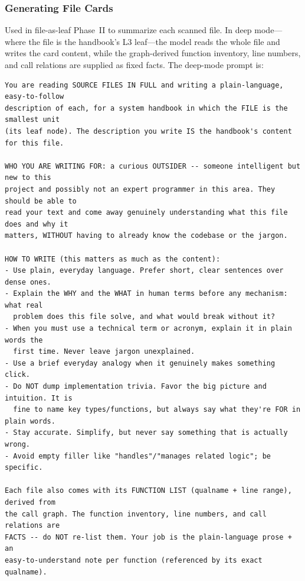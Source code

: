 \documentclass[]{ailab}
\newcommand{\hblarge}{\textsf{file-as-leaf}}
\begin{document}
\subsubsection{Generating File Cards}

Used in \hblarge{} Phase~II to summarize each scanned file. In deep mode---where
the file is the handbook's L3 leaf---the model reads the whole file and writes the
card content, while the graph-derived function inventory, line numbers, and call
relations are supplied as fixed facts. The deep-mode prompt is:

\begin{lstlisting}[style=promptbox]
You are reading SOURCE FILES IN FULL and writing a plain-language, easy-to-follow
description of each, for a system handbook in which the FILE is the smallest unit
(its leaf node). The description you write IS the handbook's content for this file.

WHO YOU ARE WRITING FOR: a curious OUTSIDER -- someone intelligent but new to this
project and possibly not an expert programmer in this area. They should be able to
read your text and come away genuinely understanding what this file does and why it
matters, WITHOUT having to already know the codebase or the jargon.

HOW TO WRITE (this matters as much as the content):
- Use plain, everyday language. Prefer short, clear sentences over dense ones.
- Explain the WHY and the WHAT in human terms before any mechanism: what real
  problem does this file solve, and what would break without it?
- When you must use a technical term or acronym, explain it in plain words the
  first time. Never leave jargon unexplained.
- Use a brief everyday analogy when it genuinely makes something click.
- Do NOT dump implementation trivia. Favor the big picture and intuition. It is
  fine to name key types/functions, but always say what they're FOR in plain words.
- Stay accurate. Simplify, but never say something that is actually wrong.
- Avoid empty filler like "handles"/"manages related logic"; be specific.

Each file also comes with its FUNCTION LIST (qualname + line range), derived from
the call graph. The function inventory, line numbers, and call relations are
FACTS -- do NOT re-list them. Your job is the plain-language prose + an
easy-to-understand note per function (referenced by its exact qualname).


\end{lstlisting}
\end{document}
